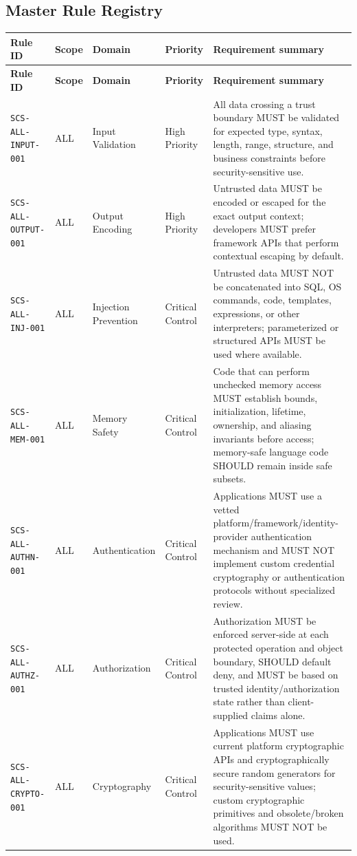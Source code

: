 \documentclass[10pt,letterpaper]{article}
\newcommand{\code}[1]{\begingroup\small\ttfamily\def\UrlFont{\ttfamily}\nolinkurl{#1}\endgroup}
\begin{document}
\begin{landscape}
\section{Master Rule Registry}
\scriptsize
\setlength{\tabcolsep}{2.5pt}
\begin{longtable}{@{}P{1.3in}P{0.8in}P{1.45in}P{1.0in}P{4.65in}@{}}
\toprule
\textbf{Rule ID} & \textbf{Scope} & \textbf{Domain} & \textbf{Priority} & \textbf{Requirement summary}\\
\midrule
\endfirsthead
\toprule
\textbf{Rule ID} & \textbf{Scope} & \textbf{Domain} & \textbf{Priority} & \textbf{Requirement summary}\\
\midrule
\endhead
\code{SCS-ALL-INPUT-001} & ALL & Input Validation & High Priority & All data crossing a trust boundary MUST be validated for expected type, syntax, length, range, structure, and business constraints before security-sensitive use.\\
\code{SCS-ALL-OUTPUT-001} & ALL & Output Encoding & High Priority & Untrusted data MUST be encoded or escaped for the exact output context; developers MUST prefer framework APIs that perform contextual escaping by default.\\
\code{SCS-ALL-INJ-001} & ALL & Injection Prevention & Critical Control & Untrusted data MUST NOT be concatenated into SQL, OS commands, code, templates, expressions, or other interpreters; parameterized or structured APIs MUST be used where available.\\
\code{SCS-ALL-MEM-001} & ALL & Memory Safety & Critical Control & Code that can perform unchecked memory access MUST establish bounds, initialization, lifetime, ownership, and aliasing invariants before access; memory-safe language code SHOULD remain inside safe subsets.\\
\code{SCS-ALL-AUTHN-001} & ALL & Authentication & Critical Control & Applications MUST use a vetted platform/framework/identity-provider authentication mechanism and MUST NOT implement custom credential cryptography or authentication protocols without specialized review.\\
\code{SCS-ALL-AUTHZ-001} & ALL & Authorization & Critical Control & Authorization MUST be enforced server-side at each protected operation and object boundary, SHOULD default deny, and MUST be based on trusted identity/authorization state rather than client-supplied claims alone.\\
\code{SCS-ALL-CRYPTO-001} & ALL & Cryptography & Critical Control & Applications MUST use current platform cryptographic APIs and cryptographically secure random generators for security-sensitive values; custom cryptographic primitives and obsolete/broken algorithms MUST NOT be used.\\

\end{longtable}
\end{landscape}
\end{document}
